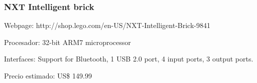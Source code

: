 
\subsubsection{NXT Intelligent brick}

Webpage: http://shop.lego.com/en-US/NXT-Intelligent-Brick-9841

Procesador: 32-bit ARM7 microprocessor

Interfaces: Support for Bluetooth, 1 USB 2.0 port, 4 input ports, 3 output ports.

Precio estimado: US\$ 149.99

